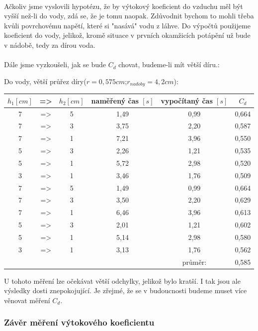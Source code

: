 \documentclass[14pt,a4paper]{article}
\begin{document}
\paragraph{}
Ačkoliv jsme vyslovili hypotézu, že by výtokový koeficient do vzduchu měl být vyšší než-li do vody, zdá se, že je tomu naopak. Zdůvodnit bychom to mohli třeba kvůli povrchovému napětí, které si "nasává" vodu z láhve. Do výpočtů použijeme koeficient do vody, jelikož, kromě situace v prvních okamžicích potápění už bude v nádobě, tedy za dírou voda. 
\paragraph{} Dále jsme vyzkoušeli, jak se bude $C_d$ chovat, budeme-li mít větší díru.:
\begin{center}
\begin{large}
Do vody, větší průřez díry($r=0,575cm$;$r_{nadoby}=4,2cm$):
\end{large}
\begin{tabular}{|ccc|c|c||c||}
\hline 
$h_1 [cm]$&=>&$h_2 [cm]$& naměřený čas $[s]$& vypočítaný čas $[s]$ & $C_d$\\ 
\hline 
\hline 
7 &=>& 5 & 1,49 & 0,99 & 0,664\\ 
\hline 
7 &=>& 3 & 3,75 & 2,20 & 0,587\\ 
\hline 
7 &=>& 1 & 7,21 & 3,96 & 0,550\\ 
\hline 
5 &=>& 3 & 2,26 & 1,21 & 0,535\\ 
\hline 
5 &=>& 1 & 5,72 & 2,98& 0,520\\ 
\hline 
3 &=>& 1 & 3,46 & 1,76 & 0,509\\ 
\hline 
7 &=>& 5 & 1,49 & 0,99 & 0,664\\ 
\hline 
7 &=>& 3 & 3,50 & 2,20 & 0,629\\ 
\hline 
7 &=>& 1 & 6,46 & 3,96 & 0,613\\ 
\hline 
5 &=>& 3 & 2,01 & 1,21 & 0,602\\ 
\hline 
5 &=>& 1 & 5,14 & 2,98& 0,580\\ 
\hline 
3 &=>& 1 & 3,13 & 1,76 & 0,562\\ 
\hline 
\hline 
&&  &  & průměr: & 0,585\\ 
\hline 
\end{tabular}
\end{center}
U tohoto měření lze očekávat větší odchylky, jelikož bylo kratší. I tak jsou ale výsledky dosti znepokojující. Je zřejmé, že se v budoucnosti budeme muset více věnovat měření $C_d$. 
\subsubsection{Závěr měření výtokového koeficientu}
\end{document}
